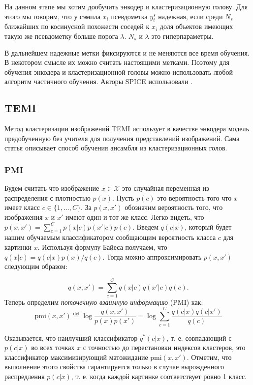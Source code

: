 \documentclass[a4paper,12pt]{extarticle}
\newcommand{\defeq}{\stackrel{\text{def}}{=}}
\begin{document}
На данном этапе мы хотим дообучить энкодер и кластеризационную голову.
Для этого мы говорим, что у сэмпла $x_i$ псевдометка $y_i^s$ 
надежная, если среди $N_s$ ближайших по косинусной похожести 
соседей к $x_i$ доля объектов имеющих такую же псевдометку 
больше порога $\lambda$. $N_s$ и $\lambda$ это гиперпараметры.

В дальнейшем надежные метки фиксируются и не меняются 
все время обучения. В некотором смысле их можно считать 
настоящими метками. Поэтому для обучения энкодера и 
кластеризационной головы можно использовать любой 
алгоритм частичного обучения. Авторы SPICE использовали 
\cite{NEURIPS2020_06964dce}.

\subsection{TEMI}

Метод кластеризации изображений TEMI \cite{Adaloglou_2023_BMVC} 
использует в качестве энкодера модель 
предобученную без учителя для получения представлений изображений. 
Сама статья описывает способ обучения ансамбля из кластеризационных голов.

\subsubsection{PMI}

Будем считать что изображение $x\in\mathcal{X}$ это случайная 
переменная из распределения с плотностью $p(x)$.
Пусть $p(c)$ это вероятность того что $x$ имеет 
класс $c\in\{1, \ldots, C\}$. За $p(x, x')$ обозначим 
вероятность того, что изображения 
$x$ и $x'$ имеют один и тот же класс. Легко видеть, что 
$p(x, x')=\sum_{c=1}^{C}p(x|c)p(x'|c)p(c)$. Введем 
$q(c|x)$, который будет нашим обучаемым классификатором 
сообщающим вероятность класса $c$ для картинки $x$. 
Используя формулу Байеса получаем, что $q(x|c)=
q(c|x)p(x)/q(c)$. Тогда можно аппроксимировать 
$p(x, x')$ следующим образом:

\[
	q(x, x')=\sum_{c=1}^C q(x|c)q(x'|c) q(c).
\]
Теперь определим \textit{поточечную взаимную информацию} (PMI)
как:
\[
	\text{pmi}(x, x') \defeq \log \frac{q(x, x')}{p(x)p(x')} = 
	\log \sum_{c=1}^C \frac{q(c|x)q(c|x')}{q(c)}
\]

Оказывается, что наилучший классификатор $q^{\ast}(c|x)$, 
т. е. совпадающий с $p(c|x)$ во всех точках $x$ с 
точностью до перестановки индексов кластеров, 
это классификатор максимизирующий матожидание $\text{pmi}(x, x')$.
Отметим, что выполнение этого свойства гарантируется только 
в случае вырожденного распредления $p(c|x)$, т. е. когда 
каждой картинке соответствует ровно 1 класс.
\end{document}

